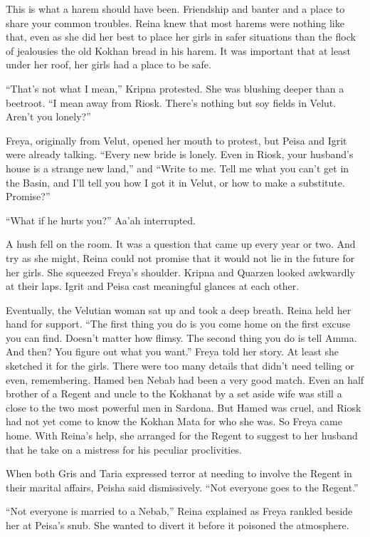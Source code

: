 \documentclass{article}
\begin{document}
	This is what a harem should have been. Friendship and banter and a place to share your common troubles. Reina knew that most harems were nothing like that, even as she did her best to place her girls in safer situations than the flock of jealousies the old Kokhan bread in his harem.  It was important that at least under her roof, her girls had a place to be safe.
	
	“That’s not what I mean,” Kripna protested. She was blushing deeper than a beetroot. “I mean away from Riosk. There’s nothing but soy fields in Velut. Aren’t you lonely?”
	
	Freya, originally from Velut, opened her mouth to protest, but Peisa and Igrit were already talking. “Every new bride is lonely. Even in Riosk, your husband’s house is a strange new land,” and “Write to me.  Tell me what you can’t get in the Basin, and I’ll tell you how I got it in Velut, or how to make a substitute. Promise?” 
	
	“What if he hurts you?” Aa’ah interrupted.
	
	A hush fell on the room. It was a question that came up every year or two. And try as she might, Reina could not promise that it would not lie in the future for her girls. She squeezed Freya’s shoulder.  Kripna and Quarzen looked awkwardly at their laps. Igrit and Peisa cast meaningful glances at each other. 
	
	
	Eventually, the Velutian woman sat up and took a deep breath. Reina held her hand for support. “The first thing you do is you come home on the first excuse you can find. Doesn’t matter how flimsy. The second thing you do is tell Amma. And then? You figure out what you want.” Freya told her story. At least she sketched it for the girls. There were too many details that didn’t need telling or even, remembering. Hamed ben Nebab had been a very good match. Even an half brother of a Regent and uncle to the Kokhanat by a set aside wife was still a close to the two most powerful men in Sardona. But Hamed was cruel, and Riosk had not yet come to know the Kokhan Mata for who she was. So Freya came home. With Reina’s help, she arranged for the Regent to suggest to her husband that he take on a mistress for his peculiar proclivities. 
	
	When both Gris and Taria expressed terror at needing to involve the Regent in their marital affairs, Peisha said dismissively. “Not everyone goes to the Regent.”
	
	“Not everyone is married to a Nebab,” Reina explained as Freya rankled beside her at Peisa’s snub. She wanted to divert it before it poisoned the atmosphere.
	
\end{document}
